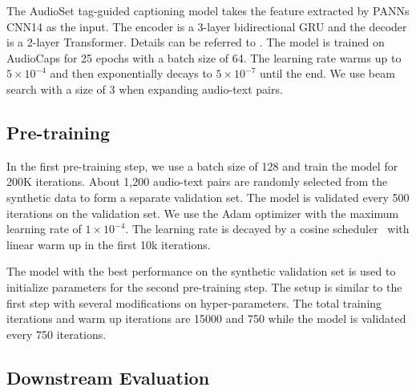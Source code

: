\documentclass[sigconf]{acmart}
\begin{document}
The AudioSet tag-guided captioning model takes the feature extracted by PANNs CNN14 as the input.
The encoder is a 3-layer bidirectional GRU and the decoder is a 2-layer Transformer.
Details can be referred to \cite{xu2022sjtu}.
The model is trained on AudioCaps for 25 epochs with a batch size of 64.
The learning rate warms up to $5\times10^{-4}$ and then exponentially decays to $5\times10^{-7}$ until the end.
We use beam search with a size of 3 when expanding audio-text pairs.

\subsection{Pre-training}

In the first pre-training step, we use a batch size of 128 and train the model for 200K iterations.
About 1,200 audio-text pairs are randomly selected from the synthetic data to form a separate validation set.
The model is validated every 500 iterations on the validation set.
We use the Adam optimizer with the maximum learning rate of $1\times10^{-4}$.
The learning rate is decayed by a cosine scheduler~\cite{loshchilov2016sgdr} with linear warm up in the first 10k iterations.

The model with the best performance on the synthetic validation set is used to initialize parameters for the second pre-training step.
The setup is similar to the first step with several modifications on hyper-parameters.
The total training iterations and warm up iterations are 15000 and 750 while the model is validated every 750 iterations.

\subsection{Downstream Evaluation}
\end{document}
